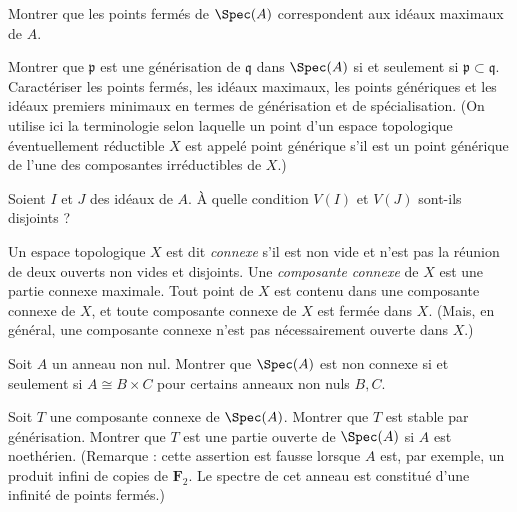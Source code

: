 \begin{exercise}
\label{exercise-closed-maximal}
Montrer que les points fermés de $\Spec(A)$
correspondent aux idéaux maximaux de $A$.
\end{exercise}

\begin{exercise}
\label{exercise-generalization}
Montrer que ${\mathfrak p}$ est une générisation de ${\mathfrak q}$
dans $\Spec(A)$ si et seulement si ${\mathfrak p}\subset {\mathfrak q}$.
Caractériser les points fermés,
les idéaux maximaux, les points génériques et les idéaux premiers minimaux en termes de
générisation et de spécialisation. (On utilise ici la terminologie selon laquelle un point
d'un espace topologique éventuellement réductible $X$ est appelé point générique
s'il est un point générique de l'une des composantes irréductibles de $X$.)
\end{exercise}

\begin{exercise}
\label{exercise-disjoint-closed-spec}
Soient $I$ et $J$ des idéaux de $A$.
À quelle condition $V(I)$ et $V(J)$ sont-ils disjoints ?
\end{exercise}

\begin{definition}
\label{definition-connected-component}
Un espace topologique $X$ est dit {\it connexe} s'il est non vide et n'est pas la
réunion de deux ouverts non vides et disjoints. Une {\it composante connexe}
de $X$ est une partie connexe maximale. Tout point de $X$ est contenu
dans une composante connexe de $X$, et toute composante connexe de $X$ est
fermée dans $X$. (Mais, en général, une composante connexe n'est pas nécessairement ouverte dans $X$.)
\end{definition}

\begin{exercise}
\label{exercise-disconnected-spec}
Soit $A$ un anneau non nul.
Montrer que $\Spec(A)$ est non connexe
si et seulement si $A\cong B \times C$ pour certains anneaux non nuls $B, C$.
\end{exercise}

\begin{exercise}
\label{exercise-connected-component-stable-generalization}
Soit $T$ une composante connexe
de $\Spec(A)$. Montrer que $T$ est stable par générisation.
Montrer que $T$ est une partie ouverte de $\Spec(A)$ si $A$ est noethérien.
(Remarque : cette assertion est fausse lorsque $A$ est, par exemple, un produit infini de copies de
${\mathbf F}_2$. Le spectre de cet anneau est constitué d'une infinité
de points fermés.)
\end{exercise}

